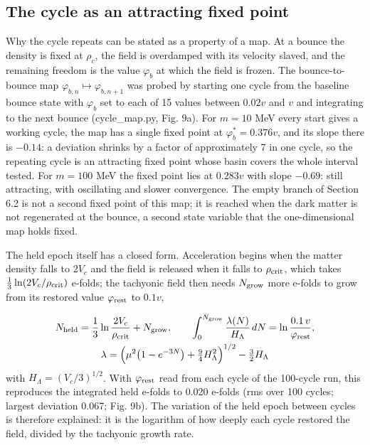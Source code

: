\documentclass[11pt,a4paper]{article}
\begin{document}
\subsection{The cycle as an attracting fixed point}
Why the cycle repeats can be stated as a property of a map. At a bounce the density is fixed at $\rho_c$, the field is overdamped with its velocity slaved, and the remaining freedom is the value $\varphi_b$ at which the field is frozen. The bounce-to-bounce map $\varphi_{b,n}\mapsto\varphi_{b,n+1}$ was probed by starting one cycle from the baseline bounce state with $\varphi_b$ set to each of 15 values between $0.02v$ and $v$ and integrating to the next bounce (cycle\_map.py, Fig. 9a). For $m=10$ MeV every start gives a working cycle, the map has a single fixed point at $\varphi_b^*=0.376v$, and its slope there is $-0.14$: a deviation shrinks by a factor of approximately 7 in one cycle, so the repeating cycle is an attracting fixed point whose basin covers the whole interval tested. For $m=100$ MeV the fixed point lies at $0.283v$ with slope $-0.69$: still attracting, with oscillating and slower convergence. The empty branch of Section 6.2 is not a second fixed point of this map; it is reached when the dark matter is not regenerated at the bounce, a second state variable that the one-dimensional map holds fixed.

The held epoch itself has a closed form. Acceleration begins when the matter density falls to $2V_c$ and the field is released when it falls to $\rho_{\rm crit}$, which takes $\frac13\ln(2V_c/\rho_{\rm crit})$ e-folds; the tachyonic field then needs $N_{\rm grow}$ more e-folds to grow from its restored value $\varphi_{\rm rest}$ to $0.1v$,

\begin{equation}\begin{gathered}
N_{\rm held}=\frac{1}{3}\ln\frac{2V_c}{\rho_{\rm crit}}+N_{\rm grow},\qquad \int_0^{N_{\rm grow}}\frac{\lambda(N)}{H_\Lambda}\,dN=\ln\frac{0.1\,v}{\varphi_{\rm rest}},\\
\lambda=\Big(\mu^2\big(1-e^{-3N}\big)+\tfrac94H_\Lambda^2\Big)^{1/2}-\tfrac32H_\Lambda
\end{gathered}\end{equation}
with $H_\Lambda=(V_c/3)^{1/2}$. With $\varphi_{\rm rest}$ read from each cycle of the 100-cycle run, this reproduces the integrated held e-folds to 0.020 e-folds (rms over 100 cycles; largest deviation 0.067; Fig. 9b). The variation of the held epoch between cycles is therefore explained: it is the logarithm of how deeply each cycle restored the field, divided by the tachyonic growth rate.
\end{document}
